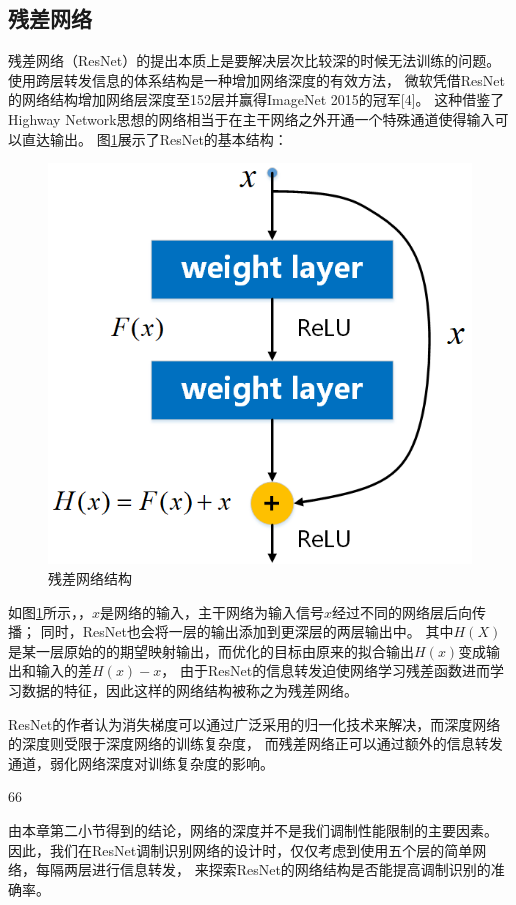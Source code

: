 \subsection{残差网络}
残差网络（ResNet）的提出本质上是要解决层次比较深的时候无法训练的问题。
使用跨层转发信息的体系结构是一种增加网络深度的有效方法，
微软凭借ResNet的网络结构增加网络层深度至152层并赢得ImageNet 2015的冠军[4]。
这种借鉴了Highway Network思想的网络相当于在主干网络之外开通一个特殊通道使得输入可以直达输出。
图\ref{sec:fig_5_5}展示了ResNet的基本结构：\par
\begin{figure}[!h]
	\centering
	\includegraphics[scale=0.6]{figures/chapter_5/fig_5_5}
	\caption{残差网络结构}\label{sec:fig_5_5}
\end{figure}
如图\ref{sec:fig_5_5}所示，，$x$是网络的输入，主干网络为输入信号$x$经过不同的网络层后向传播；
同时，ResNet也会将一层的输出添加到更深层的两层输出中。
其中$H(X)$是某一层原始的的期望映射输出，而优化的目标由原来的拟合输出$H(x)$变成输出和输入的差$H(x)-x$，
由于ResNet的信息转发迫使网络学习残差函数进而学习数据的特征，因此这样的网络结构被称之为残差网络。\par
ResNet的作者认为消失梯度可以通过广泛采用的归一化技术来解决，而深度网络的深度则受限于深度网络的训练复杂度，
而残差网络正可以通过额外的信息转发通道，弱化网络深度对训练复杂度的影响。\par66

由本章第二小节得到的结论，网络的深度并不是我们调制性能限制的主要因素。
因此，我们在ResNet调制识别网络的设计时，仅仅考虑到使用五个层的简单网络，每隔两层进行信息转发，
来探索ResNet的网络结构是否能提高调制识别的准确率。


